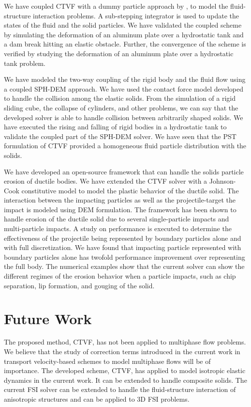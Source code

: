 We have coupled CTVF with a dummy particle approach by \textcite{Adami2012}, to
model the fluid-structure interaction problems. A sub-stepping integrator is
used to update the states of the fluid and the solid particles. We have
validated the coupled scheme by simulating the deformation of an aluminum plate
over a hydrostatic tank and a dam break hitting an elastic obstacle. Further,
the convergence of the scheme is verified by studying the deformation of an
aluminum plate over a hydrostatic tank problem.

We have modeled the two-way coupling of the rigid body and the fluid flow using
a coupled SPH-DEM approach. We have used the contact force model developed to
handle the collision among the elastic solids. From the simulation of a rigid
sliding cube, the collapse of cylinders, and other problems, we can say that the
developed solver is able to handle collision between arbitrarily shaped solids.
We have executed the rising and falling of rigid bodies in a hydrostatic tank to
validate the coupled part of the SPH-DEM solver. We have seen that the PST
formulation of CTVF provided a homogeneous fluid particle distribution with the
solids.


We have developed an open-source framework that can handle the solids particle
erosion of ductile bodies. We have extended the CTVF solver with a Johnson-Cook
constitutive model to model the plastic behavior of the ductile solid. The
interaction between the impacting particles as well as the projectile-target the
impact is modeled using DEM formulation. The framework has been shown to handle
erosion of the ductile solid due to several single-particle impacts and
multi-particle impacts. A study on performance is executed to determine the
effectiveness of the projectile being represented by boundary particles alone
and with full discretization. We have found that impacting particle represented
with boundary particles alone has twofold performance improvement over
representing the full body. The numerical examples show that the current solver
can show the different regimes of the erosion behavior when a particle impacts,
such as chip separation, lip formation, and gouging of the solid.



\section{Future Work}\label{conclusions:future_work}
The proposed method, CTVF, has not been applied to multiphase flow problems. We
believe that the study of correction terms introduced in the current work in
transport velocity-based schemes to model multiphase flows will be of
importance. The developed scheme, CTVF, has applied to model isotropic elastic
dynamics in the current work. It can be extended to handle composite
solids. The current FSI solver can be extended to handle the fluid-structure
interaction of anisotropic structures and can be applied to 3D FSI problems.


